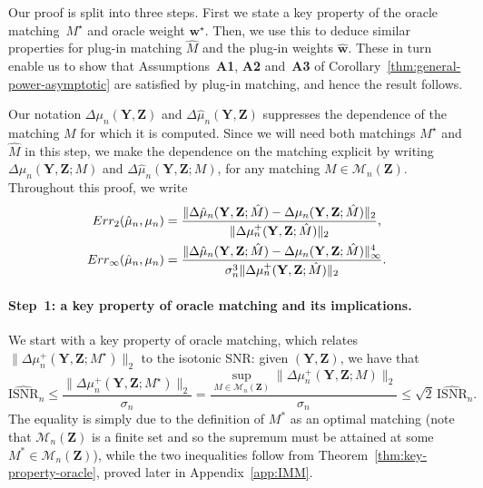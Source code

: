\documentclass[12pt]{article}
\newcommand{\ISNR}{\mathrm{ISNR}}
\newcommand{\bY}{\mathbf{Y}}
\newcommand{\bZ}{\mathbf{Z}}
\newcommand{\bw}{\mathbf{w}}
\begin{document}
Our proof is split into three steps. First we state a key property of the oracle matching~$M^\star$ and oracle weight $\bw^\star$. Then, we use this to deduce similar properties for plug-in matching $\hat{M}$ and the plug-in weights $\hat{\bw}$. These in turn enable us to show that Assumptions~\textbf{A1}, \textbf{A2} and~\textbf{A3} of Corollary~\ref{thm:general-power-asymptotic} are satisfied by plug-in matching, and hence the result follows.

Our notation $\Delta\mu_n(\bY,\bZ)$ and $\Delta\hat{\mu}_n(\bY,\bZ)$ suppresses the dependence of the matching $M$ for which it is computed.  Since we will need both matchings $M^\star$ and $\hat{M}$ in this step, we make the dependence on the matching explicit by writing $\Delta\mu_n(\bY,\bZ;M)$ and $\Delta\hat{\mu}_n(\bY,\bZ;M)$, for any matching $M\in \mathcal{M}_n(\bZ)$.
Throughout this proof, we write 
\begin{align*}
    \textnormal{Err}_2(\hat{\mu}_n,\mu_n) &= \frac{\|\Delta\hat\mu_n(\bY,\bZ;\hat{M})-\Delta\mu_n(\bY,\bZ;\hat{M})\|_2}{\|\Delta\mu_n^+(\bY,\bZ;\hat{M})\|_2}, \\ 
    \textnormal{Err}_\infty(\hat{\mu}_n,\mu_n) &= \frac{\|\Delta\hat\mu_n(\bY,\bZ;\hat{M})-\Delta\mu_n(\bY,\bZ;\hat{M})\|_\infty^4}{\sigma_n^3\|\Delta\mu_n^+(\bY,\bZ;\hat{M})\|_2}.
\end{align*}



\paragraph{Step~1: a key property of oracle matching and its implications.}


We start with a key property of oracle matching, which relates $\|\Delta\mu_n^+(\bY,\bZ;M^\star)\|_2$ to the isotonic SNR: given $(\bY,\bZ)$, we have that
\begin{equation}\label{eq:key-property-oracle-matching}
\widehat{\ISNR}_n\leq \frac{\|\Delta\mu_n^+(\bY,\bZ;M^\star)\|_2}{\sigma_n} = \frac{\sup_{M \in \mathcal{M}_n(\bZ)} \|\Delta\mu_n^+(\bY,\bZ;M)\|_2}{\sigma_n} \leq \sqrt{2}\,\widehat{\ISNR}_n.
\end{equation}
The equality is simply due to the definition of $M^*$ as an optimal matching (note that $\mathcal{M}_n(\bZ)$ is a finite set and so the supremum must be attained at some $M^*\in\mathcal{M}_n(\bZ)$), while the two inequalities follow from Theorem~\ref{thm:key-property-oracle}, proved later in Appendix~\ref{app:IMM}.
\end{document}
